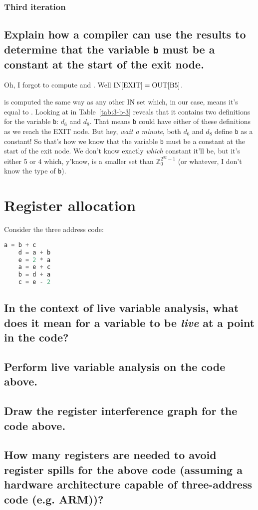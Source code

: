 

\subsubsection{Third iteration}
\renewcommand{\INBone}		{$\{d_4,~ d_6,~ d_7,~ d_8,~ d_9,~ d_{10},~ d_{12}\}$}
\renewcommand{\OUTBone}		{$\{d_1,~ d_2,~ d_3,~ d_4,~ d_7,~ d_9\}$}




\subsection{Explain how a compiler can use the results to determine that the variable \texttt{b} must be a constant at the start of the exit node.}
Oh, I forgot to compute  and .
Well $\text{IN[EXIT]} = \text{OUT[B5]}$.

 is computed the same way as any other IN set which, in our case, means it's equal to .
Looking at  in Table~\ref{tab:3-b-3} reveals that it contains two definitions for the variable \texttt{b}: $d_6$ and $d_8$.
That means \texttt{b} could have either of these definitions as we reach the EXIT node.
But hey, \emph{wait a minute}, both $d_6$ and $d_8$ define \texttt{b} as a constant!
So that's how we know that the variable \texttt{b} must be a constant at the start of the exit node.
We don't know exactly \emph{which} constant it'll be, but it's either 5 or 4 which, y'know, is a smaller set than $\mathbb{Z}_{0}^{2^{32}-1}$ (or whatever, I don't know the type of \texttt{b}).


\section{Register allocation}
Consider the three address code:
\begin{lstlisting}[language=C, tabsize=4, basicstyle=\ttfamily\small]
	a = b + c
	d = a + b
	e = 2 * a
	a = e + c
	b = d + a
	c = e - 2
\end{lstlisting}

\subsection{In the context of live variable analysis, what does it mean for a variable to be \emph{live} at a point in the code?}

\subsection{Perform live variable analysis on the code above.}

\subsection{Draw the register interference graph for the code above.}

\subsection{How many registers are needed to avoid register spills for the above code (assuming a hardware architecture capable of three-address code (e.g. ARM))?}
